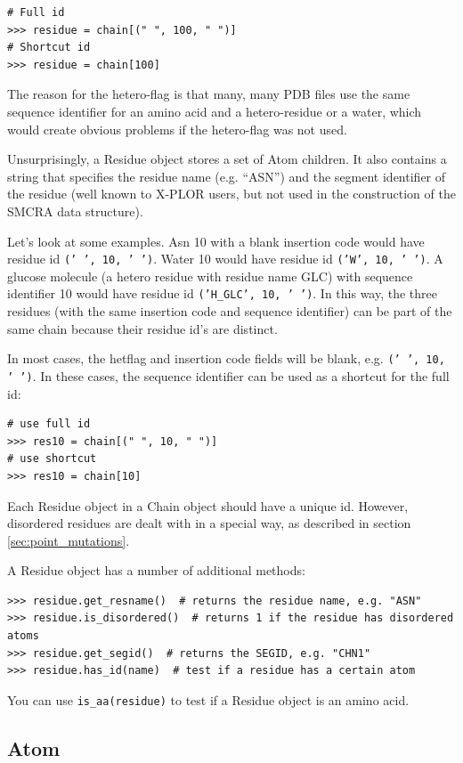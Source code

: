 \begin{verbatim}
# Full id
>>> residue = chain[(" ", 100, " ")]
# Shortcut id
>>> residue = chain[100]
\end{verbatim}
The reason for the hetero-flag is that many, many PDB files use the
same sequence identifier for an amino acid and a hetero-residue or
a water, which would create obvious problems if the hetero-flag was
not used.

Unsurprisingly, a Residue object stores a set of Atom children. It also contains a string that specifies the residue name (e.g. ``ASN'')
and the segment identifier of the residue (well known to X-PLOR users, but not
used in the construction of the SMCRA data structure).

Let's look at some examples. Asn 10 with a blank insertion code would have residue
id \texttt{(' ', 10, ' ')}. Water 10 would have residue id \texttt{('W', 10, ' ')}.
A glucose molecule (a hetero residue with residue name GLC) with sequence identifier
10 would have residue id \texttt{('H\_GLC', 10, ' ')}. In this way, the three
residues (with the same insertion code and sequence identifier) can be part
of the same chain because their residue id's are distinct.

In most cases, the hetflag and insertion code fields will be blank, e.g. \texttt{(' ', 10, ' ')}.
In these cases, the sequence identifier can be used as a shortcut for the full
id:

\begin{verbatim}
# use full id
>>> res10 = chain[(" ", 10, " ")]
# use shortcut
>>> res10 = chain[10]
\end{verbatim}

Each Residue object in a Chain object should have a unique id. However, disordered
residues are dealt with in a special way, as described in section \ref{sec:point_mutations}.

A Residue object has a number of additional methods:

\begin{verbatim}
>>> residue.get_resname()  # returns the residue name, e.g. "ASN"
>>> residue.is_disordered()  # returns 1 if the residue has disordered atoms
>>> residue.get_segid()  # returns the SEGID, e.g. "CHN1"
>>> residue.has_id(name)  # test if a residue has a certain atom
\end{verbatim}

You can use \texttt{is\_aa(residue)} to test if a Residue object is an amino acid.

\subsection{Atom}

